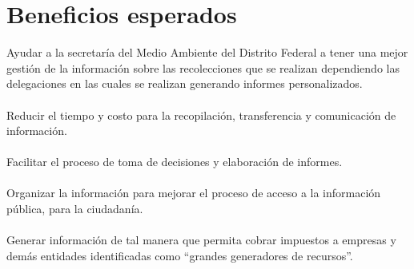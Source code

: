 \section{Beneficios esperados}
\textbullet Ayudar a la secretaría del Medio Ambiente del Distrito Federal a tener una mejor gestión de la información sobre las recolecciones que se realizan dependiendo las delegaciones en las cuales se realizan generando informes personalizados.\\\\
\textbullet Reducir el tiempo y costo para la recopilación, transferencia y comunicación de información.\\\\
\textbullet Facilitar el proceso de toma de decisiones y elaboración de informes.\\\\
\textbullet Organizar la información para mejorar el proceso de acceso a la información pública, para la ciudadanía.\\\\
\textbullet Generar información de tal manera que permita cobrar impuestos a empresas y demás entidades identificadas como “grandes generadores de recursos”.\\\\

